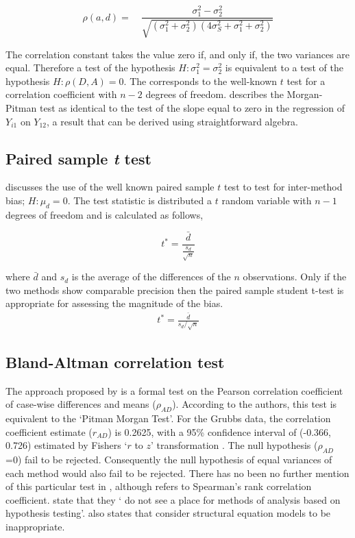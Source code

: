 \documentclass[Main.tex]{subfiles}
\begin{document}
\begin{equation}
\rho(a,d)=\quad\frac{\sigma^{2}_{1}-\sigma^{2}_{2}}{\sqrt{(\sigma^{2}_{1}+\sigma^{2}_{2})(4\sigma^{2}_{S}+\sigma^{2}_{1}+\sigma^{2}_{2})}}
\end{equation}

The correlation constant takes the value zero if, and only if, the two variances are equal. Therefore a test of the hypothesis $H: \sigma^{2}_{1}=\sigma^{2}_{2}$ is equivalent to a test of the hypothesis $H: \rho(D,A) = 0$. The corresponds to the well-known
$t$ test for a correlation coefficient with $n-2$ degrees of freedom. \citet{Bartko} describes the Morgan-Pitman test as identical to
the test of the slope equal to zero in the regression of $Y_{i1}$ on $Y_{12}$, a result that can be derived using
straightforward algebra.


\subsection{Paired sample \emph{t} test}

\citet{Bartko} discusses the use of the well known paired sample
$t$ test to test for inter-method bias; $H: \mu_{d}=0$. The test
statistic is distributed a $t$ random variable with $n-1$ degrees
of freedom and is calculated as follows,

\begin{equation}
t^{*} = \frac{\bar{d}}{ \frac{s_{d}}{\sqrt{n}}}
\end{equation}

where $\bar{d}$ and $s_{d}$ is the average of the differences of
the $n$ observations. Only if the two methods show comparable
precision then the paired sample student t-test is appropriate for
assessing the magnitude of the bias.
\begin{eqnarray}
t^{*} = \frac{\bar{d}}{s_{d}/\sqrt{n}}
\end{eqnarray}

	\subsection{Bland-Altman correlation test}
	
	The approach proposed by \citet{BA83} is a formal test on the
	Pearson correlation coefficient of case-wise differences and means ($\rho_{AD}$). According to the authors, this test is equivalent
	to the `Pitman Morgan Test'. For the Grubbs data, the correlation coefficient estimate ($r_{AD}$) is 0.2625, with a 95\% confidence
	interval of (-0.366, 0.726) estimated by Fishers `$r$ to $z$' transformation \citep*{Cohen}. The null hypothesis ($\rho_{AD}$ =0)
	fail to be rejected. Consequently the null hypothesis of equal variances of each method would also fail to be rejected. There has
	no been no further mention of this particular test in \citet{BA86}, although \citet{BA99} refers to Spearman's rank
	correlation coefficient. \citet{BA99} state that they ` do not see a place for methods of analysis based on hypothesis testing'.
	\citet{BA99} also states that consider structural equation models to be inappropriate.
	
\end{document}
